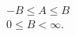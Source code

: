 \begin{equation}
\begin{array}{c}
    -B \leq A \leq B\\
    0 \leq B < \infty.
  \end{array}
\end{equation}

